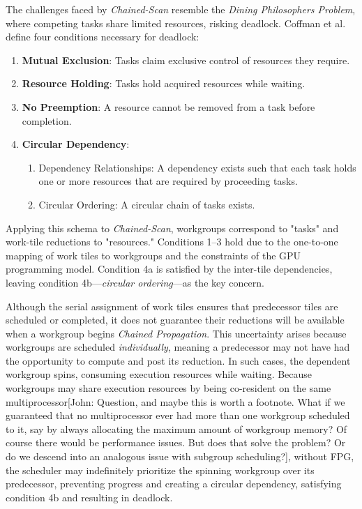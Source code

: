 \documentclass[sigconf]{acmart}
\newcommand{\john}[1]{{\footnotesize\color{cyan}[John: #1]}}
\begin{document}
The challenges faced by \emph{Chained-Scan} resemble the \emph{Dining Philosophers Problem}, where competing tasks share limited resources, risking deadlock. Coffman et al.~\cite{10.1145/356586.356588} define four conditions necessary for deadlock:
\begin{enumerate}
  \item \textbf{Mutual Exclusion}: Tasks claim exclusive control of resources they require.
  \item \textbf{Resource Holding}: Tasks hold acquired resources while waiting.
  \item \textbf{No Preemption}: A resource cannot be removed from a task before completion.
  \item \textbf{Circular Dependency}:
        \begin{enumerate}
          \item Dependency Relationships: A dependency exists such that each task holds one or more resources that are required by proceeding tasks.
          \item Circular Ordering: A circular chain of tasks exists.
        \end{enumerate}
\end{enumerate}
Applying this schema to \emph{Chained-Scan}, workgroups correspond to "tasks" and work-tile reductions to "resources." Conditions 1–3 hold due to the one-to-one mapping of work tiles to workgroups and the constraints of the GPU programming model. Condition 4a is satisfied by the inter-tile dependencies, leaving condition 4b---\emph{circular ordering}---as the key concern.

Although the serial assignment of work tiles ensures that predecessor tiles are scheduled or completed, it does not guarantee their reductions will be available when a workgroup begins \emph{Chained Propagation}. This uncertainty arises because workgroups are scheduled \emph{individually}, meaning a predecessor may not have had the opportunity to compute and post its reduction. In such cases, the dependent workgroup spins, consuming execution resources while waiting. Because workgroups may share execution resources by being co-resident on the same multiprocessor\john{Question, and maybe this is worth a footnote. What if we guaranteed that no multiprocessor ever had more than one workgroup scheduled to it, say by always allocating the maximum amount of workgroup memory? Of course there would be performance issues. But does that solve the problem? Or do we descend into an analogous issue with subgroup scheduling?}, without FPG, the scheduler may indefinitely prioritize the spinning workgroup over its predecessor, preventing progress and creating a circular dependency, satisfying condition 4b and resulting in deadlock.
\end{document}
